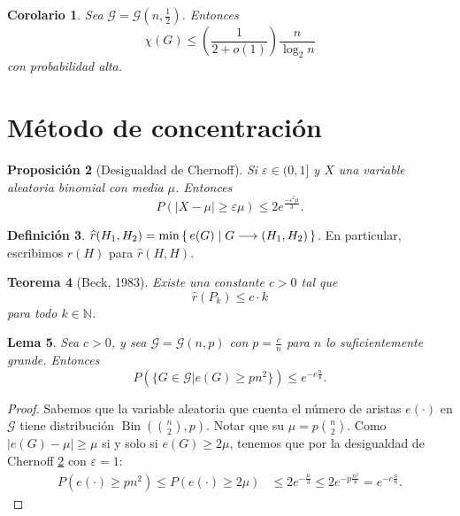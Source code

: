 \documentclass[12pt]{report}
\theoremstyle{plain}
\newtheorem{theorem}{Teorema}[section]
\newtheorem{lemma}[theorem]{Lema}
\newtheorem{proposition}[theorem]{Proposición}
\newtheorem{corollary}[theorem]{Corolario}
\theoremstyle{definition}
\newtheorem{definition}[theorem]{Definición}
\newcommand{\naturals}{\mathbb{N}}
\newcommand{\abs}[1]{\left \vert #1 \right \vert}
\renewcommand{\hat}[1]{\widehat{#1}}
\begin{document}
\begin{corollary}
Sea $\mathcal G = \mathcal G(n, \frac 1 2)$. Entonces
\[
\chi (G) \leq \left (\frac 1 {2 + o(1)} \right ) \frac{n}{\log_2 n}
\]
con probabilidad alta.
\end{corollary}



\section{Método de concentración}


\begin{proposition}[Desigualdad de Chernoff]\label{proposition:desigualdad de chernoff}
Si $\varepsilon \in (0, 1]$ y $X$ una variable aleatoria binomial con media $\mu$. Entonces
\[
    P (\abs{X - \mu} \geq \varepsilon \mu) \leq 2 e^{\frac{-\varepsilon^2 \mu}{3}}.
\]
\end{proposition}

\begin{definition}
$\hat r (H_1,H_2) = \min \set{e(G) | G \longrightarrow (H_1,H_2)}$. En particular, escribimos $\hat r (H)$ para $\hat r (H,H)$.
\end{definition}

\begin{theorem}[Beck, 1983]\label{th:teorema de Beck}
Existe una constante $c > 0$ tal que
\[
    \hat r (P_k) \leq c \cdot k
\]
para todo $k \in \naturals$.
\end{theorem}


\begin{lemma}
Sea $c > 0$, y sea $\mathcal G = \mathcal G (n,p)$ con $p = \frac c n$ para $n$ lo suficientemente grande. Entonces
\[
    P\left (\{G \in \mathcal G | e(G) \geq p n^2\} \right ) \leq e^{- c \frac n 8}.
\]
\end{lemma}
\begin{proof}
Sabemos que la variable aleatoria que cuenta el número de aristas $e(\cdot) $ en $\mathcal G$ tiene distribución $\operatorname{Bin} (\binom n 2 , p)$. Notar que su $\mu = p \binom n2$. Como $\abs {e(G) - \mu} \geq \mu$ si y solo si $e(G) \geq 2 \mu$, tenemos que por la desigualdad de Chernoff \ref{proposition:desigualdad de chernoff} con $\varepsilon = 1$:
\begin{align*}
P(e(\cdot) \geq p n^2) \leq P (e(\cdot ) \geq 2 \mu) &\leq 2 e^{- \frac \mu 3} \leq 2 e^{- p \frac{n^2}{8}} = e^{- c \frac n 8}.
\end{align*}
\end{proof}
\end{document}

